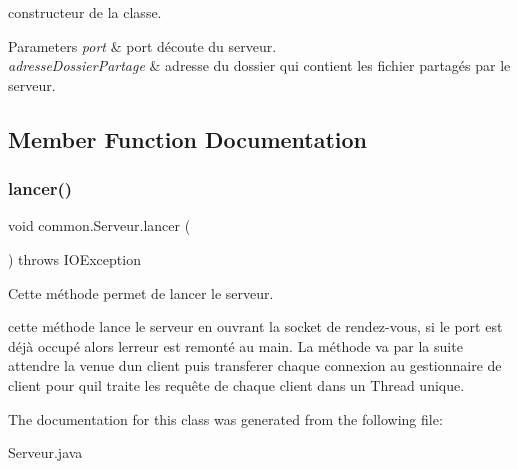 constructeur de la classe. 


\begin{DoxyParams}{Parameters}
{\em port} & port d\textquotesingle{}écoute du serveur. \\
\hline
{\em adresse\+Dossier\+Partage} & adresse du dossier qui contient les fichier partagés par le serveur. \\
\hline
\end{DoxyParams}


\subsection{Member Function Documentation}
\mbox{\label{classcommon_1_1Serveur_a9924019a4577e360dafa9ab6df2d4ffd}} 
\subsubsection{\texorpdfstring{lancer()}{lancer()}}
{\footnotesize\ttfamily void common.\+Serveur.\+lancer (\begin{DoxyParamCaption}{ }\end{DoxyParamCaption}) throws I\+O\+Exception\hspace{0.3cm}{\ttfamily [inline]}}



Cette méthode permet de lancer le serveur. 

cette méthode lance le serveur en ouvrant la socket de rendez-\/vous, si le port est déjà occupé alors l\textquotesingle{}erreur est remonté au main. La méthode va par la suite attendre la venue d\textquotesingle{}un client puis transferer chaque connexion au gestionnaire de client pour qu\textquotesingle{}il traite les requête de chaque client dans un Thread unique. 

The documentation for this class was generated from the following file\+:\begin{DoxyCompactItemize}
\item 
Serveur.\+java\end{DoxyCompactItemize}
